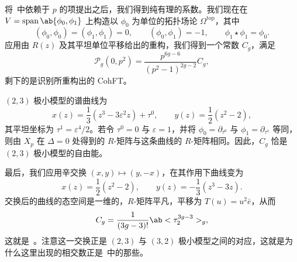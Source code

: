 \documentclass{amsart}
\theoremstyle{definition}
\theoremstyle{remark}
\theoremstyle{plain}
\theoremstyle{definition}
\theoremstyle{remark}
\newcommand{\ep}{\varepsilon}
\newcommand{\mc}[1]{\mathcal{#1}}
\newcommand{\mr}[1]{\mathrm{#1}}
\newcommand{\on}[1]{\operatorname{#1}}
\newcommand{\1}{\mathbf{1}}
\newcommand{\2}{\mathbf{2}}
\newcommand{\3}{\mathbf{3}}
\begin{document}
将~中依赖于 \(p\) 的项提出之后，我们得到纯有理的系数。我们现在在 \(V = \on{span}\ab\{\phi_0,\phi_1\}\) 上构造以 \(\phi_0\) 为单位的拓扑场论 \(\Omega^{\mr{top}}\)，其中
\[ (\phi_0,\phi_0) = (\phi_1,\phi_1) = 0, \qquad (\phi_0,\phi_1) = -1, \qquad \phi_1 \star \phi_1 = \phi_0. \]
应用由 \(R(z)\) 及其平坦单位平移给出的重构，我们得到一个常数 \(C_g\)，满足
\[ \mc{P}_g(0,p^2) = \frac{p^{6g-6}}{(p^2-1)^{2g-2}}C_g, \]
剩下的是识别所重构出的 CohFT。

\((2,3)\) 极小模型的谱曲线为
\[ x(z) = \frac{1}{3}(z^3-3\ep^2 z) + \tau^0, \qquad y(z) = \frac{1}{2}(z^2-2), \]
其平坦坐标为 \(\tau^1 = \ep^4/2\)。若令 \(\tau^0 = 0\) 与 \(\ep = 1\)，并将 \(\phi_0 = \partial_{\tau^0}\) 与 \(\phi_1 = \partial_{\tau^1}\) 等同，则由 \(X_p\) 在 \(\Delta = 0\) 处得到的 \(R\)-矩阵与这条曲线的 \(R\)-矩阵相同。因此，\(C_g\) 恰是 \((2,3)\) 极小模型的自由能。

最后，我们应用辛交换 \((x,y) \mapsto (y,-x)\)，在其作用下曲线变为
\[ x(z) = \frac{1}{2}(z^2-2), \qquad y(z) = -\frac{1}{3}(z^3-3z). \]
交换后的曲线的态空间是一维的，\(R\)-矩阵平凡，平移为 \(T(u) = u^2 \bar{e}\)，从而
\[ C_g = \frac{1}{(3g-3)!}\ab<\tau_2^{3g-3}>_g, \]
这就是~。注意这一交换正是 \((2,3)\) 与 \((3,2)\) 极小模型之间的对应，这就是为什么这里出现的相交数正是~中的那些。

\printbibliography[title={参考文献}]
\end{document}

